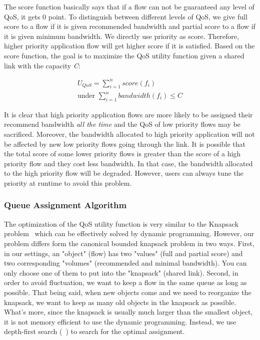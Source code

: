 The score function basically says that if a flow can not be guaranteed any level of QoS, it gets 0 point. To distinguish between different
levels of QoS, we give full score to a flow if it is given recommended bandwidth and partial score to a flow if it is given minimum bandwidth.
We directly use priority as score. Therefore, higher priority application flow will get higher score if it is satisfied. Based on the score
function, the goal is to maximize the QoS utility function given a shared link with the capacity \emph{C}:

\begin{equation}
\begin{split}
  U_{QoS} = \sum_{i=1}^{n} score(f_i) \\ 
  \text{under } \sum_{i=1}^{n} bandwidth(f_i) \leq C
\end{split}
\end{equation}

It is clear that high priority application flows are more likely to be assigned their recommend bandwidth \emph{all the time} and the QoS of low
priority flows may be sacrificed. Moreover, the bandwidth allocated to high priority application will not be affected by new low priority flows
going through the link. It is possible that the total score of some lower priority flows is greater than the score of a high priority flow and
they cost less bandwidth. In that case, the bandwidth allocated to the high priority flow will be degraded. However, users can always tune the
priority at runtime to avoid this problem.

\subsubsection{Queue Assignment Algorithm}
\label{sect:queueAssignAlgo}

The optimization of the QoS utility function is very similar to the Knapsack problem~\cite{knapsack} which can be effectively solved by dynamic
programming. However, our problem differs form the canonical bounded knapsack problem in two ways. First, in our settings, an "object" (flow) has
two "values" (full and partial score) and two corresponding "volumes" (recommended and minimal bandwidth). You can only choose one of them to put
into the "knapsack" (shared link). Second, in order to avoid fluctuation, we want to keep a flow in the same queue as long as possible. That being
said, when new objects come and we need to reorganize the knapsack, we want to keep as many old objects in the knapsack as possible. What's more,
since the knapsack is usually much larger than the smallest object, it is not memory efficient to use the dynamic programming. Instead, we use
depth-first search (~) to search for the optimal assignment.

